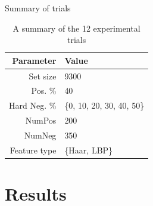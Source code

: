 \begin{frame}{Summary of trials}

	\begin{table}
		\centering
		\caption{A summary of the 12 experimental trials}
		\label{tab:training_schemes}
		\begin{tabularx}{\columnwidth}{@{}rX@{}}
			\toprule
			\textbf{Parameter} & \textbf{Value} \\
			\midrule
	{Set size}     & 9300 \\
	{Pos. \%}      & 40 \\
	{Hard Neg. \%} & \{0, 10, 20, 30, 40, 50\} \\
	{NumPos}       & 200 \\
	{NumNeg}       & 350 \\
	{Feature type} & \{Haar, LBP\} \\
			\bottomrule
		\end{tabularx}
	\end{table}
\end{frame}


\section{Results}

